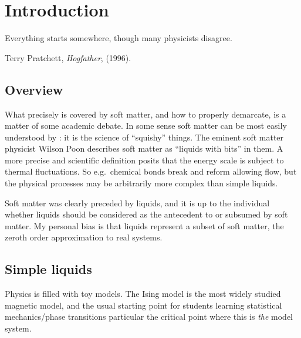 \documentclass[11pt,twoside]{report}
\begin{document}
\chapter{Introduction}
\epigraph{Everything starts somewhere, though many physicists disagree.}{Terry Pratchett, \emph{Hogfather}, (1996).}

\section{Overview}


What precisely is covered by soft matter, and how to properly demarcate, is a matter of some academic debate.
In some sense soft matter can be most easily understood by : it is the science of ``squishy'' things.
The eminent soft matter physicist Wilson Poon describes soft matter as ``liquids with bits'' in them.
A more precise and scientific definition posits that the energy scale is subject to thermal fluctuations.
So e.g.\ chemical bonds break and reform allowing flow, but the physical processes may be arbitrarily more complex than simple liquids.

Soft matter was clearly preceded by liquids, and it is up to the individual whether liquids should be considered as the antecedent to or subsumed by soft matter.
My personal bias is that liquids represent a subset of soft matter, the zeroth order approximation to real systems.

\section{Simple liquids}

Physics is filled with toy models.
The Ising model is the most widely studied magnetic model, and the usual starting point for students learning statistical mechanics/phase transitions particular the critical point where this is \emph{the} model system.
\end{document}
